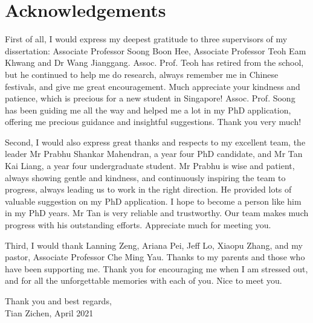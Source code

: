 \chapter*{\centering Acknowledgements}
\begin{spacing}{1.4}
\setlength{\parskip}{0.3in}
\thispagestyle{addin}

First of all, I would express my deepest gratitude to three supervisors of my dissertation: Associate Professor Soong Boon Hee, Associate Professor Teoh Eam Khwang and Dr Wang Jianggang. Assoc. Prof. Teoh has retired from the school, but he continued to help me do research, always remember me in Chinese festivals, and give me great encouragement. Much appreciate your kindness and patience, which is precious for a new student in Singapore! Assoc. Prof. Soong has been guiding me all the way and helped me a lot in my PhD application, offering me precious guidance and insightful suggestions. Thank you very much!

Second, I would also express great thanks and respects to my excellent team, the leader Mr Prabhu Shankar Mahendran, a year four PhD candidate, and Mr Tan Kai Liang, a year four undergraduate student. Mr Prabhu is wise and patient, always showing gentle and kindness, and continuously inspiring the team to progress, always leading us to work in the right direction. He provided lots of valuable suggestion on my PhD application. I hope to become a person like him in my PhD years. Mr Tan is very reliable and trustworthy. Our team makes much progress with his outstanding efforts. Appreciate much for meeting you.

Third, I would thank Lanning Zeng, Ariana Pei, Jeff Lo, Xiaopu Zhang, and my pastor, Associate Professor Che Ming Yau. Thanks to my parents and those who have been supporting me. Thank you for encouraging me when I am stressed out, and for all the unforgettable memories with each of you. Nice to meet you.

Thank you and best regards,\\
Tian Zichen, April 2021

\end{spacing}
\newpage
